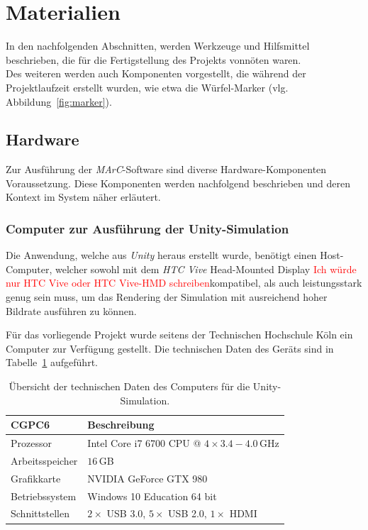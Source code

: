 \section{Materialien}\label{sec:Materialien}
In den nachfolgenden Abschnitten, werden Werkzeuge und Hilfsmittel beschrieben, die für die Fertigstellung des Projekts vonnöten waren.\\ Des weiteren werden auch Komponenten vorgestellt, die während der Projektlaufzeit erstellt wurden, wie etwa die Würfel-Marker (vlg. Abbildung~\ref{fig:marker}).

\subsection{Hardware}
Zur Ausführung der \emph{MArC}-Software sind diverse Hardware-Komponenten Voraussetzung. Diese Komponenten werden nachfolgend beschrieben und deren Kontext im System näher erläutert.
\subsubsection{Computer zur Ausführung der Unity-Simulation}\label{sec:UnityComp}
Die Anwendung, welche aus \textit{Unity} \cite{website:Unity} heraus erstellt wurde, benötigt einen Host-Computer, welcher sowohl mit dem \textit{HTC Vive} Head-Mounted Display \textcolor{red}{Ich würde nur HTC Vive oder HTC Vive-HMD schreiben}kompatibel, als auch leistungsstark genug sein muss, um das Rendering der Simulation mit ausreichend hoher Bildrate ausführen zu können.

Für das vorliegende Projekt wurde seitens der Technischen Hochschule Köln ein Computer zur Verfügung gestellt. Die technischen Daten des Geräts sind in Tabelle~\ref{tab:UnityCompParam} aufgeführt.

\begin{table}
	\centering
	\begin{tabular}{|l|l|}
		\hline
		\Absatzbox{}
		\textbf{CGPC6}& \textbf{Beschreibung} \\
		\hline
		Prozessor & Intel Core i7 6700 CPU @ $4\times3.4-4.0\,$GHz \\
		\hline
		Arbeitsspeicher & $16\,$GB \\
 		\hline 
		Grafikkarte & NVIDIA GeForce GTX 980\\
		\hline
		Betriebssystem & Windows 10 Education 64 bit \\
		\hline
		Schnittstellen & $2\times$ USB 3.0, $5\times$ USB 2.0, $1\times $ HDMI\\
		\hline
	\end{tabular}
	\caption{Übersicht der technischen Daten des Computers für die Unity-Simulation.}
	\label{tab:UnityCompParam}
\end{table}


